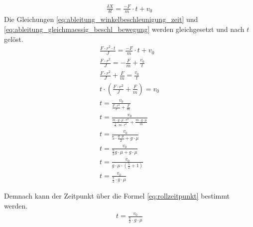 \begin{align}
    \frac{\delta X}{\delta t} = \frac{-F}{m} \cdot t + v_0\label{eq:ableitung_gleichmaessig_beschl_bewegung}
\end{align}
Die Gleichungen \ref{eq:ableitung_winkelbeschleunigung_zeit} und \ref{eq:ableitung_gleichmaessig_beschl_bewegung} werden gleichgesetzt und nach $t$ gelöst.
\begin{align}
    \frac{F \cdot r^2 \cdot t}{J} = \frac{-F}{m} \cdot t + v_0\\
    \frac{F \cdot r^2}{J} = -\frac{F}{m} + \frac{v_0}{t}\\
    \frac{F \cdot r^2}{J} + \frac{F}{m} = \frac{v_0}{t}\\
    t \cdot (\frac{F \cdot r^2}{J} + \frac{F}{m}) = v_0\\
    t = \frac{v_0}{\frac{F \cdot r^2}{J} + \frac{F}{m}}\\
    t = \frac{v_0}{\frac{m \cdot g \cdot \mu \cdot r^2}{\frac{2}{5} \cdot m \cdot r^2} + \frac{m \cdot g \cdot \mu}{m}}\\
    t = \frac{v_0}{5 \cdot \frac{g \cdot \mu}{2} + g \cdot \mu}\\
    t = \frac{v_0}{\frac{5}{2} g \cdot \mu + g \cdot \mu}\\
    t = \frac{v_0}{g \cdot \mu \cdot (\frac{5}{2} + 1)}\\
    t = \frac{v_0}{\frac{7}{2} \cdot g \cdot \mu}
\end{align}

Demnach kann der Zeitpunkt über die Formel \ref{eq:rollzeitpunkt} bestimmt werden.
\begin{align}
    t = \frac{v_0}{\frac{7}{2} \cdot g \cdot \mu}\label{eq:rollzeitpunkt}
\end{align}